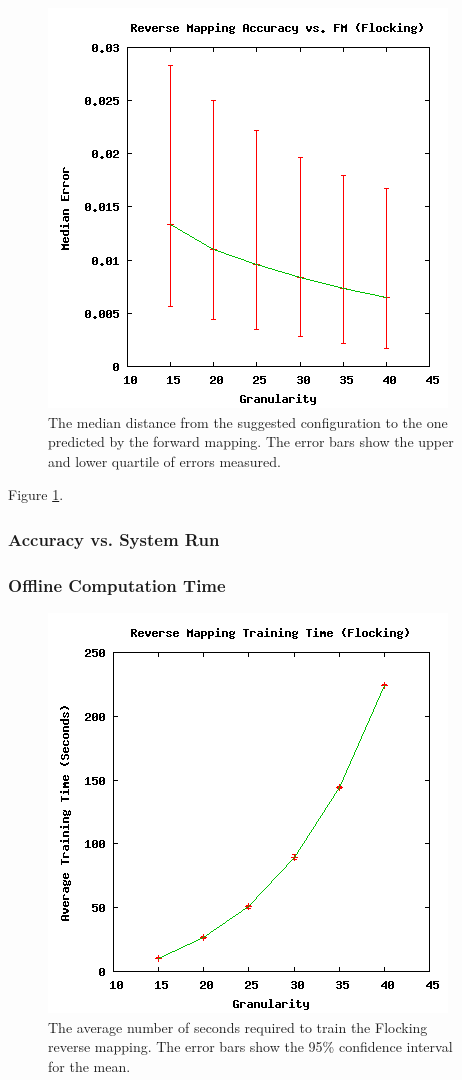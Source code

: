 \begin{figure}[ht]
\centering
\includegraphics[scale=.5]{images/results_flocking/rmacc.png}
\caption{The median distance from the suggested configuration to the one predicted by the forward mapping.
The error bars show the upper and lower quartile of errors measured.}
\label{fig:flockrmacc}
\end{figure}

Figure \ref{fig:flockrmacc}.

  \subsubsection{Accuracy vs. System Run}

  \subsubsection{Offline Computation Time}

\begin{figure}[ht]
\centering
\includegraphics[scale=.5]{images/results_flocking/rmtraining.png}
\caption{The average number of seconds required to train the Flocking reverse mapping.
The error bars show the 95\% confidence interval for the mean.}
\label{fig:flockrmtraining}
\end{figure}

